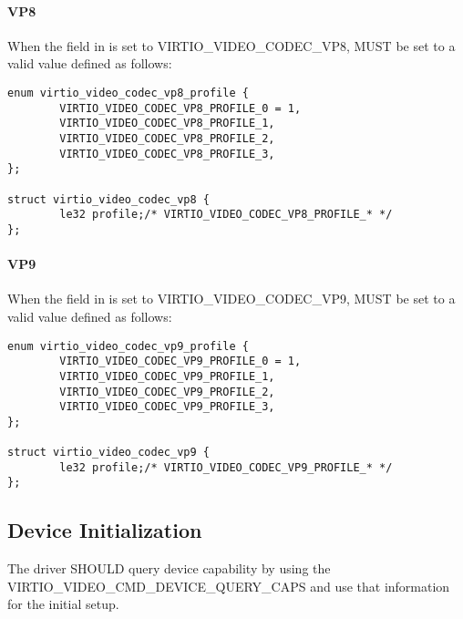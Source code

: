 \paragraph{VP8}

When the field  in 
is set to VIRTIO_VIDEO_CODEC_VP8,  MUST be set to a
valid value defined as follows:

\begin{lstlisting}
enum virtio_video_codec_vp8_profile {
        VIRTIO_VIDEO_CODEC_VP8_PROFILE_0 = 1,
        VIRTIO_VIDEO_CODEC_VP8_PROFILE_1,
        VIRTIO_VIDEO_CODEC_VP8_PROFILE_2,
        VIRTIO_VIDEO_CODEC_VP8_PROFILE_3,
};

struct virtio_video_codec_vp8 {
        le32 profile;/* VIRTIO_VIDEO_CODEC_VP8_PROFILE_* */
};
\end{lstlisting}

\paragraph{VP9}

When the field  in 
is set to VIRTIO_VIDEO_CODEC_VP9,  MUST be set to a
valid value defined as follows:

\begin{lstlisting}
enum virtio_video_codec_vp9_profile {
        VIRTIO_VIDEO_CODEC_VP9_PROFILE_0 = 1,
        VIRTIO_VIDEO_CODEC_VP9_PROFILE_1,
        VIRTIO_VIDEO_CODEC_VP9_PROFILE_2,
        VIRTIO_VIDEO_CODEC_VP9_PROFILE_3,
};

struct virtio_video_codec_vp9 {
        le32 profile;/* VIRTIO_VIDEO_CODEC_VP9_PROFILE_* */
};
\end{lstlisting}

\subsection{Device Initialization}
\label{sec:Device Types / Video Device / Device Initialization}


The driver SHOULD query device capability by using the
VIRTIO_VIDEO_CMD_DEVICE_QUERY_CAPS and use that information for the
initial setup.

